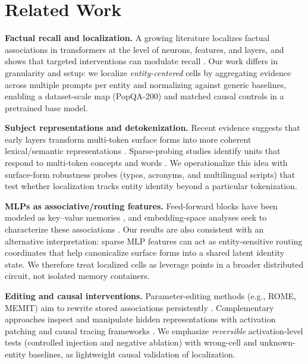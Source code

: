 \documentclass[10pt,twocolumn]{article}
\begin{document}
\section{Related Work}
\textbf{Factual recall and localization.} A growing literature localizes factual associations in transformers at the level of neurons, features, and layers, and shows that targeted interventions can modulate recall \cite{dai2022knowledgeneurons,nanda2023fact,geva2023dissecting,hernandez2023linearity}. Our work differs in granularity and setup: we localize \emph{entity-centered} cells by aggregating evidence across multiple prompts per entity and normalizing against generic baselines, enabling a dataset-scale map (PopQA-200) and matched causal controls in a pretrained base model.

\textbf{Subject representations and detokenization.} Recent evidence suggests that early layers transform multi-token surface forms into more coherent lexical/semantic representations \cite{elhage2022solu,kaplan2024tokens,feucht2024token}. Sparse-probing studies identify units that respond to multi-token concepts and words \cite{gurnee2023findingneuronshaystackcase}. We operationalize this idea with surface-form robustness probes (typos, acronyms, and multilingual scripts) that test whether localization tracks entity identity beyond a particular tokenization.

\textbf{MLPs as associative/routing features.} Feed-forward blocks have been modeled as key--value memories \cite{geva2021kv}, and embedding-space analyses seek to characterize these associations \cite{dar2023analyzingtransformersembeddingspace}. Our results are also consistent with an alternative interpretation: sparse MLP features can act as entity-sensitive routing coordinates that help canonicalize surface forms into a shared latent identity state. We therefore treat localized cells as leverage points in a broader distributed circuit, not isolated memory containers.

\textbf{Editing and causal interventions.} Parameter-editing methods (e.g., ROME, MEMIT) aim to rewrite stored associations persistently \cite{meng2022rome,meng2023memit}. Complementary approaches inspect and manipulate hidden representations with activation patching and causal tracing frameworks \cite{ghandeharioun2024patchscopesunifyingframeworkinspecting}. We emphasize \emph{reversible} activation-level tests (controlled injection and negative ablation) with wrong-cell and unknown-entity baselines, as lightweight causal validation of localization.
\end{document}
